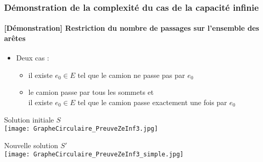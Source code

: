 \begin{frame}
  \frametitle{Démonstration de la complexité du cas de la capacité infinie}
  \framesubtitle{[Démonstration] Restriction du nombre de passages sur l'ensemble des arêtes}
  {
    \begin{itemize}
    \item<1-> Deux cas :
      \begin{itemize}
      \item<2-> il existe $e_0 \in E$ tel que le camion ne passe pas par $e_0$
      \item<3-> le camion passe par tous les sommets et\\
      il existe $e_0 \in E$ tel que le camion passe exactement une fois par $e_0$
      \end{itemize}
    \end{itemize}
  }
  {
    \begin{center}
      {
        \begin{minipage}[c]{.4\linewidth}
        \begin{center}
          Solution initiale $S$\\
          \texttt{[image: GrapheCirculaire\_PreuveZeInf3.jpg]}
        \end{center}
        \end{minipage} \hfill
      }
      {
        \begin{minipage}[c]{.4\linewidth}
        \begin{center}
          Nouvelle solution $S'$\\
          \texttt{[image: GrapheCirculaire\_PreuveZeInf3\_simple.jpg]}
        \end{center}
        \end{minipage} \hfill
      }
    \end{center}
  }
\end{frame}
